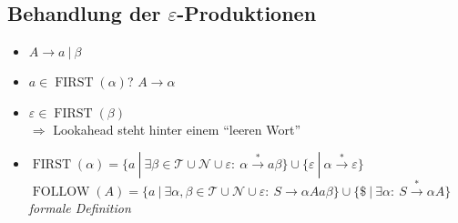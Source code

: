 \subsection{Behandlung der $\varepsilon$-Produktionen}
\begin{itemize}
 \item $A \to a\ |\ \beta$
 \item $a \in \operatorname{FIRST}(\alpha)$? $A \to \alpha$ 
 \item $\varepsilon \in \operatorname{FIRST}(\beta)$ \\
       $\Rightarrow$ Lookahead steht hinter einem "`leeren Wort"'
 \item $\operatorname{FIRST}(\alpha) = \{a\ |\ \exists\beta \in \mathcal{T} \cup \mathcal{N} \cup \varepsilon{:}\ \alpha \xrightarrow{*} a\beta\} \cup \{\varepsilon\ |\ \alpha \xrightarrow{*} \varepsilon\}$\\
       $\operatorname{FOLLOW}(A) = \{a\ |\ \exists\alpha, \beta \in \mathcal{T} \cup \mathcal{N} \cup \varepsilon{:}\ S \to \alpha Aa\beta\} \cup \{\$\ |\ \exists\alpha{:}\ S \xrightarrow{*} \alpha A\}$\\
       \emph{formale Definition}
\end{itemize}

